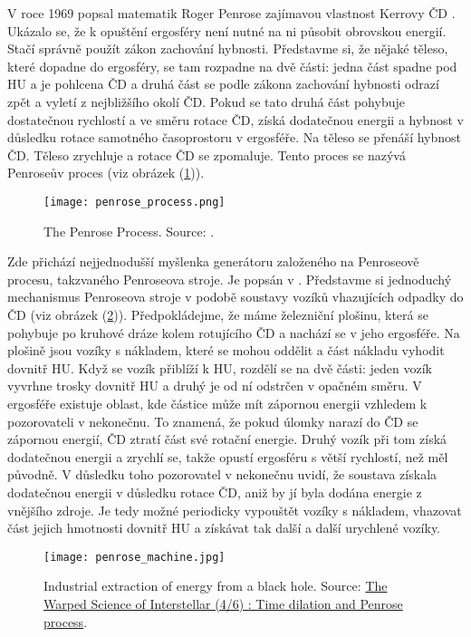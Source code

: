 \documentclass[
	a4paper, %
	10pt, %
	unnumberedsections, %
	twoside, %
]{LTJournalArticle}
\begin{document}
V roce 1969 popsal matematik Roger Penrose zajímavou vlastnost Kerrovy ČD \autocite{penrose2002}. Ukázalo se, že k opuštění ergosféry není nutné na ni působit obrovskou energií. Stačí správně použít zákon zachování hybnosti. Představme si, že nějaké těleso, které dopadne do ergosféry, se tam rozpadne na dvě části: jedna část spadne pod HU a je pohlcena ČD a druhá část se podle zákona zachování hybnosti odrazí zpět a vyletí z nejbližšího okolí ČD. Pokud se tato druhá část pohybuje dostatečnou rychlostí a ve směru rotace ČD, získá dodatečnou energii a hybnost v důsledku rotace samotného časoprostoru v ergosféře. Na těleso se přenáší hybnost ČD. Těleso zrychluje a rotace ČD se zpomaluje. Tento proces se nazývá Penroseův proces (viz obrázek (\ref{fig:penrose_process})).

\begin{figure} %
	\texttt{[image: penrose\_process.png]}
	\caption{The Penrose Process. Source: \textcite{brito2020}.}
	\label{fig:penrose_process}
\end{figure}

Zde přichází nejjednodušší myšlenka generátoru založeného na Penroseově procesu, takzvaného Penroseova stroje. Je popsán v \textcite{misner1973}. Představme si jednoduchý mechanismus Penroseova stroje v podobě soustavy vozíků vhazujících odpadky do ČD (viz obrázek (\ref{fig:penrose_machine})). Předpokládejme, že máme železniční plošinu, která se pohybuje po kruhové dráze kolem rotujícího ČD a nachází se v jeho ergosféře. Na plošině jsou vozíky s nákladem, které se mohou oddělit a část nákladu vyhodit dovnitř HU. Když se vozík přiblíží k HU, rozdělí se na dvě části: jeden vozík vyvrhne trosky dovnitř HU a druhý je od ní odstrčen v opačném směru. V ergosféře existuje oblast, kde částice může mít zápornou energii vzhledem k pozorovateli v nekonečnu. To znamená, že pokud úlomky narazí do ČD se zápornou energií, ČD ztratí část své rotační energie. Druhý vozík při tom získá dodatečnou energii a zrychlí se, takže opustí ergosféru s větší rychlostí, než měl původně. V důsledku toho pozorovatel v nekonečnu uvidí, že soustava získala dodatečnou energii v důsledku rotace ČD, aniž by jí byla dodána energie z vnějšího zdroje. Je tedy možné periodicky vypouštět vozíky s nákladem, vhazovat část jejich hmotnosti dovnitř HU a získávat tak další a další urychlené vozíky.

\begin{figure} %
	\texttt{[image: penrose\_machine.jpg]}
	\caption{Industrial extraction of energy from a black hole. Source: \href{https://blogs.futura-sciences.com/e-luminet/2016/01/16/warped-science-interstellar-46-time-dilation-penrose-process/}{The Warped Science of Interstellar (4/6) : Time dilation and Penrose process}.}
	\label{fig:penrose_machine}
\end{figure}
\end{document}
